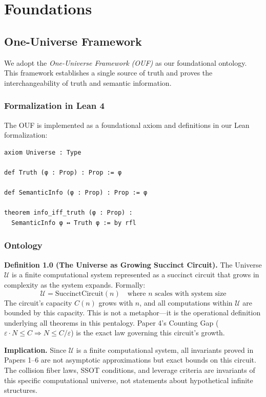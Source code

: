 \section{Foundations}\label{foundations}

\subsection{One-Universe Framework}\label{one-universe-framework}

We adopt the \emph{One-Universe Framework (OUF)} as our foundational ontology. This framework establishes a single source of truth and proves the interchangeability of truth and semantic information.

\subsubsection{Formalization in Lean 4}

The OUF is implemented as a foundational axiom and definitions in our Lean formalization:

\begin{lstlisting}[language=lean]
axiom Universe : Type

def Truth (φ : Prop) : Prop := φ

def SemanticInfo (φ : Prop) : Prop := φ

theorem info_iff_truth (φ : Prop) : 
  SemanticInfo φ ↔ Truth φ := by rfl
\end{lstlisting}

\subsubsection{Ontology}

\textbf{Definition 1.0 (The Universe as Growing Succinct Circuit).} 
The Universe $\mathcal{U}$ is a finite computational system represented as a succinct circuit 
that grows in complexity as the system expands. Formally:
\[
\mathcal{U} = \text{SuccinctCircuit}(n) \quad \text{where } n \text{ scales with system size}
\]
The circuit's capacity $C(n)$ grows with $n$, and all computations within $\mathcal{U}$ 
are bounded by this capacity. This is not a metaphor---it is the operational definition 
underlying all theorems in this pentalogy. Paper 4's Counting Gap ($\varepsilon \cdot N \leq C \Rightarrow N \leq C/\varepsilon$) 
is the exact law governing this circuit's growth.

\textbf{Implication.} Since $\mathcal{U}$ is a finite computational system, all invariants proved 
in Papers 1--6 are not asymptotic approximations but exact bounds on this circuit. 
The collision fiber laws, SSOT conditions, and leverage criteria are invariants of this 
specific computational universe, not statements about hypothetical infinite structures.


